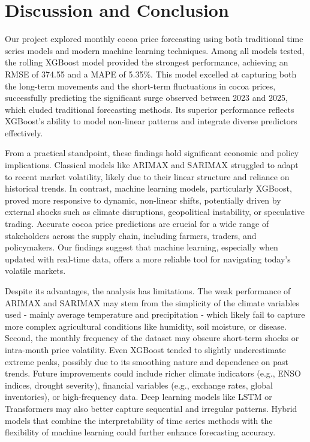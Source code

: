 \documentclass[
  letterpaper,
  DIV=11,
  numbers=noendperiod]{scrartcl}
\begin{document}
\hypertarget{discussion-and-conclusion}{%
\section{Discussion and Conclusion}\label{discussion-and-conclusion}}

Our project explored monthly cocoa price forecasting using both
traditional time series models and modern machine learning techniques.
Among all models tested, the rolling XGBoost model provided the
strongest performance, achieving an RMSE of 374.55 and a MAPE of 5.35\%.
This model excelled at capturing both the long-term movements and the
short-term fluctuations in cocoa prices, successfully predicting the
significant surge observed between 2023 and 2025, which eluded
traditional forecasting methods. Its superior performance reflects
XGBoost's ability to model non-linear patterns and integrate diverse
predictors effectively.

From a practical standpoint, these findings hold significant economic
and policy implications. Classical models like ARIMAX and SARIMAX
struggled to adapt to recent market volatility, likely due to their
linear structure and reliance on historical trends. In contrast, machine
learning models, particularly XGBoost, proved more responsive to
dynamic, non-linear shifts, potentially driven by external shocks such
as climate disruptions, geopolitical instability, or speculative
trading. Accurate cocoa price predictions are crucial for a wide range
of stakeholders across the supply chain, including farmers, traders, and
policymakers. Our findings suggest that machine learning, especially
when updated with real-time data, offers a more reliable tool for
navigating today's volatile markets.

Despite its advantages, the analysis has limitations. The weak
performance of ARIMAX and SARIMAX may stem from the simplicity of the
climate variables used - mainly average temperature and precipitation -
which likely fail to capture more complex agricultural conditions like
humidity, soil moisture, or disease. Second, the monthly frequency of
the dataset may obscure short-term shocks or intra-month price
volatility. Even XGBoost tended to slightly underestimate extreme peaks,
possibly due to its smoothing nature and dependence on past trends.
Future improvements could include richer climate indicators (e.g., ENSO
indices, drought severity), financial variables (e.g., exchange rates,
global inventories), or high-frequency data. Deep learning models like
LSTM or Transformers may also better capture sequential and irregular
patterns. Hybrid models that combine the interpretability of time series
methods with the flexibility of machine learning could further enhance
forecasting accuracy.
\end{document}
